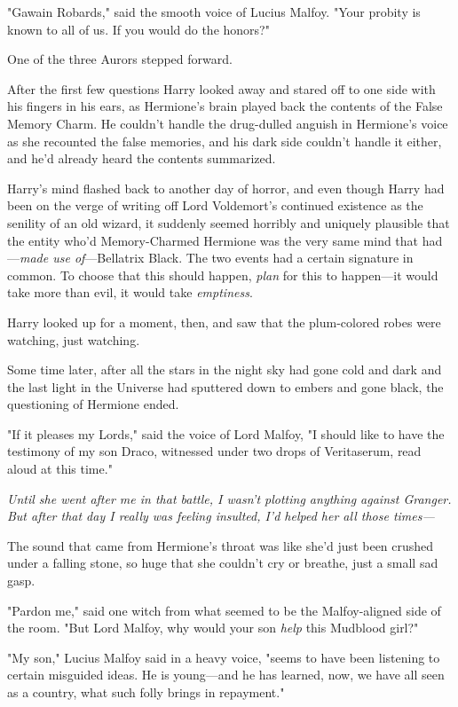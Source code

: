 "Gawain Robards," said the smooth voice of Lucius Malfoy. "Your probity is
known to all of us. If you would do the honors?"

One of the three Aurors stepped forward.

After the first few questions Harry looked away and stared off to one side with
his fingers in his ears, as Hermione's brain played back the contents of the
False Memory Charm. He couldn't handle the drug-dulled anguish in Hermione's
voice as she recounted the false memories, and his dark side couldn't handle it
either, and he'd already heard the contents summarized.

Harry's mind flashed back to another day of horror, and even though Harry had
been on the verge of writing off Lord Voldemort's continued existence as the
senility of an old wizard, it suddenly seemed horribly and uniquely plausible
that the entity who'd Memory-Charmed Hermione was the very same mind that
had---\emph{made use of}---Bellatrix Black. The two events had a certain
signature in common. To choose that this should happen, \emph{plan} for this to
happen---it would take more than evil, it would take \emph{emptiness}.

Harry looked up for a moment, then, and saw that the plum-colored robes were
watching, just watching.

Some time later, after all the stars in the night sky had gone cold and dark
and the last light in the Universe had sputtered down to embers and gone black,
the questioning of Hermione ended.

"If it pleases my Lords," said the voice of Lord Malfoy, "I should like to have
the testimony of my son Draco, witnessed under two drops of Veritaserum, read
aloud at this time."

\emph{Until she went after me in that battle, I wasn't plotting anything
against Granger. But after that day I really was feeling insulted, I'd helped
her all those times---}

The sound that came from Hermione's throat was like she'd just been crushed
under a falling stone, so huge that she couldn't cry or breathe, just a small
sad gasp.

"Pardon me," said one witch from what seemed to be the Malfoy-aligned side of
the room. "But Lord Malfoy, why would your son \emph{help} this Mudblood girl?"

"My son," Lucius Malfoy said in a heavy voice, "seems to have been listening to
certain misguided ideas. He is young---and he has learned, now, we have all
seen as a country, what such folly brings in repayment."

